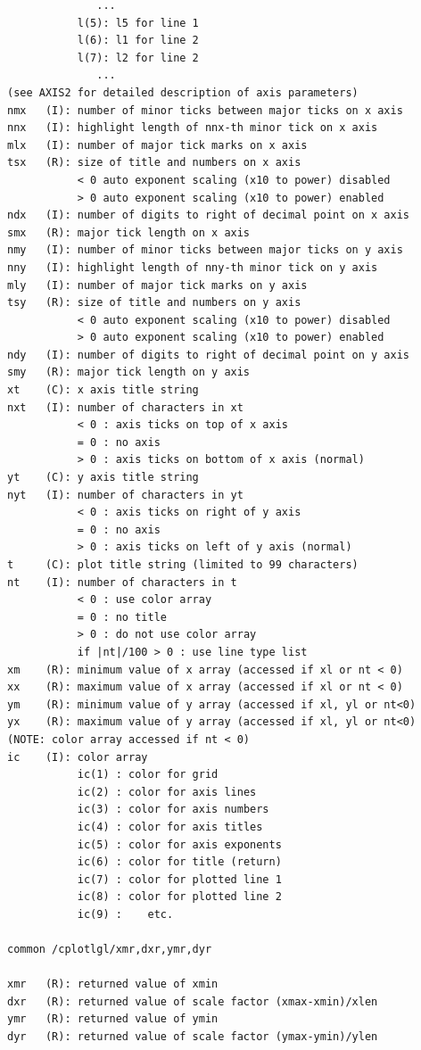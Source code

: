 \documentclass[11pt]{report}
\begin{document}
\begin{verbatim}
              ...
           l(5): l5 for line 1
           l(6): l1 for line 2
           l(7): l2 for line 2
              ...
(see AXIS2 for detailed description of axis parameters)
nmx   (I): number of minor ticks between major ticks on x axis
nnx   (I): highlight length of nnx-th minor tick on x axis
mlx   (I): number of major tick marks on x axis
tsx   (R): size of title and numbers on x axis
           < 0 auto exponent scaling (x10 to power) disabled
           > 0 auto exponent scaling (x10 to power) enabled
ndx   (I): number of digits to right of decimal point on x axis
smx   (R): major tick length on x axis
nmy   (I): number of minor ticks between major ticks on y axis
nny   (I): highlight length of nny-th minor tick on y axis
mly   (I): number of major tick marks on y axis
tsy   (R): size of title and numbers on y axis
           < 0 auto exponent scaling (x10 to power) disabled
           > 0 auto exponent scaling (x10 to power) enabled
ndy   (I): number of digits to right of decimal point on y axis
smy   (R): major tick length on y axis
xt    (C): x axis title string
nxt   (I): number of characters in xt
           < 0 : axis ticks on top of x axis
           = 0 : no axis
           > 0 : axis ticks on bottom of x axis (normal)
yt    (C): y axis title string
nyt   (I): number of characters in yt
           < 0 : axis ticks on right of y axis
           = 0 : no axis
           > 0 : axis ticks on left of y axis (normal)
t     (C): plot title string (limited to 99 characters)
nt    (I): number of characters in t
           < 0 : use color array
           = 0 : no title
           > 0 : do not use color array
           if |nt|/100 > 0 : use line type list
xm    (R): minimum value of x array (accessed if xl or nt < 0)
xx    (R): maximum value of x array (accessed if xl or nt < 0)
ym    (R): minimum value of y array (accessed if xl, yl or nt<0)
yx    (R): maximum value of y array (accessed if xl, yl or nt<0)
(NOTE: color array accessed if nt < 0)
ic    (I): color array
           ic(1) : color for grid
           ic(2) : color for axis lines
           ic(3) : color for axis numbers
           ic(4) : color for axis titles
           ic(5) : color for axis exponents
           ic(6) : color for title (return)
           ic(7) : color for plotted line 1
           ic(8) : color for plotted line 2
           ic(9) :    etc.

common /cplotlgl/xmr,dxr,ymr,dyr

xmr   (R): returned value of xmin
dxr   (R): returned value of scale factor (xmax-xmin)/xlen
ymr   (R): returned value of ymin
dyr   (R): returned value of scale factor (ymax-ymin)/ylen
\end{verbatim}
\end{document}
